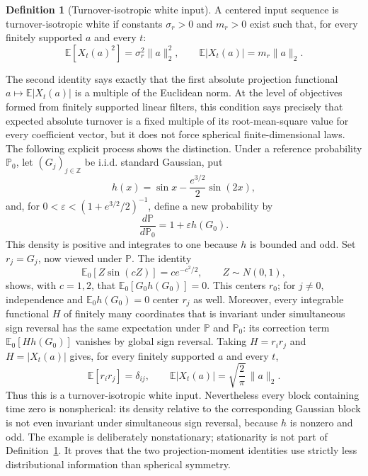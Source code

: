 \documentclass[11pt]{article}
\theoremstyle{definition}
\newtheorem{definition}[theorem]{Definition}
\theoremstyle{remark}
\begin{document}
\begin{definition}[Turnover-isotropic white input]\label{def:turnover-isotropic}
A centered input sequence is turnover-isotropic white if constants
$\sigma_r>0$ and $m_r>0$ exist such that, for every finitely supported $a$ and
every $t$:
\begin{equation}\label{eq:turnover-isotropy}
 \mathbb E[X_t(a)^2]=\sigma_r^2\|a\|_2^2,
 \qquad
 \mathbb E|X_t(a)|=m_r\|a\|_2.
\end{equation}
\end{definition}

The second identity says exactly that the first absolute projection functional
$a\mapsto\mathbb E|X_t(a)|$ is a multiple of the Euclidean norm. At the level
of objectives formed from finitely supported linear filters, this condition
says precisely that expected absolute turnover is a fixed multiple of its
root-mean-square value for every coefficient vector, but it does not force
spherical finite-dimensional laws. The following explicit process shows the
distinction. Under a reference probability $\mathbb P_0$, let
$(G_j)_{j\in\mathbb Z}$ be i.i.d. standard Gaussian, put
\[
 h(x)=\sin x-\frac{e^{3/2}}2\sin(2x),
\]
and, for $0<\varepsilon<(1+e^{3/2}/2)^{-1}$, define a new probability by
\[
 \frac{d\mathbb P}{d\mathbb P_0}
 =1+\varepsilon h(G_0).
\]
This density is positive and integrates to one because $h$ is bounded and odd.
Set $r_j=G_j$, now viewed under $\mathbb P$. The
identity
\[
 \mathbb E_0[Z\sin(cZ)]=c e^{-c^2/2},
 \qquad Z\sim N(0,1),
\]
shows, with $c=1,2$, that
$\mathbb E_0[G_0h(G_0)]=0$. This centers $r_0$; for $j\neq0$, independence
and $\mathbb E_0h(G_0)=0$ center $r_j$ as well.
Moreover, every integrable functional $H$ of finitely many coordinates that
is invariant under simultaneous sign reversal has the same expectation under
$\mathbb P$ and $\mathbb P_0$: its correction term
$\mathbb E_0[Hh(G_0)]$ vanishes by global sign reversal. Taking
$H=r_ir_j$ and $H=|X_t(a)|$ gives, for every finitely supported $a$ and every
$t$,
\[
 \mathbb E[r_ir_j]=\delta_{ij},
 \qquad
 \mathbb E|X_t(a)|
 =\sqrt{\frac2\pi}\,\|a\|_2.
\]
Thus this is a turnover-isotropic white input. Nevertheless every block
containing time zero is nonspherical: its density relative to the corresponding
Gaussian block is not even invariant under simultaneous sign reversal, because
$h$ is nonzero and odd. The example is deliberately nonstationary; stationarity
is not part of Definition~\ref{def:turnover-isotropic}. It proves that the two
projection-moment identities use strictly less distributional information than
spherical symmetry.
\end{document}
